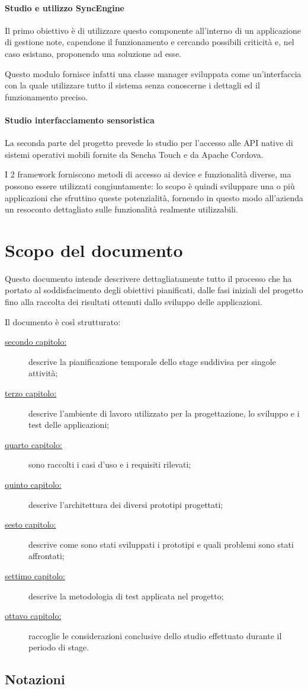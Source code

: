 \paragraph*{Studio e utilizzo SyncEngine}
Il primo obiettivo è di utilizzare questo componente all'interno di un applicazione di gestione note, capendone il funzionamento e cercando possibili criticità e, nel caso esistano, proponendo una soluzione ad esse.

Questo modulo fornisce infatti una classe manager sviluppata come un'interfaccia con la quale utilizzare tutto il sistema senza conoscerne i dettagli ed il funzionamento preciso.

\paragraph*{Studio interfacciamento sensoristica}
La seconda parte del progetto prevede lo studio per l'accesso alle \ac{API} native di sistemi operativi mobili fornite da Sencha Touch e da Apache Cordova.

I 2 framework forniscono metodi di accesso ai device e funzionalità diverse, ma possono essere utilizzati congiuntamente: lo scopo è quindi sviluppare una o più applicazioni che sfruttino queste potenzialità, fornendo in questo modo all'azienda un resoconto dettagliato sulle funzionalità realmente utilizzabili.

\section{Scopo del documento}
Questo documento intende descrivere dettagliatamente tutto il processo che ha portato al soddisfacimento degli obiettivi pianificati, dalle fasi iniziali del progetto fino alla raccolta dei risultati ottenuti dallo sviluppo delle applicazioni.

Il documento è così strutturato:
\begin{description}
\item[{\hyperref[ch:pianificazione]{secondo capitolo:}}] descrive la pianificazione temporale dello stage suddivisa per singole attività; 
\item[{\hyperref[ch:ambiente]{terzo capitolo:}}] descrive l'ambiente di lavoro utilizzato per la progettazione, lo sviluppo e i test delle applicazioni;
\item[{\hyperref[ch:requisiti]{quarto capitolo:}}] sono raccolti i casi d'uso e i requisiti rilevati;
\item[{\hyperref[ch:progettazione]{quinto capitolo:}}] descrive l'architettura dei diversi prototipi progettati;
\item[{\hyperref[ch:sviluppo]{sesto capitolo:}}] descrive come sono stati sviluppati i prototipi e quali problemi sono stati affrontati;
\item[{\hyperref[ch:test]{settimo capitolo:}}] descrive la metodologia di test applicata nel progetto;
\item[{\hyperref[ch:conclusioni]{ottavo capitolo:}}] raccoglie le considerazioni conclusive dello studio effettuato durante il periodo di stage.
\end{description}

\subsection{Notazioni}